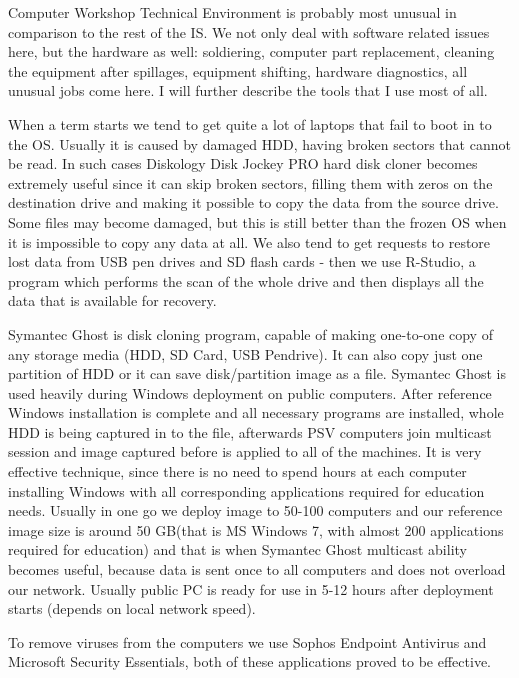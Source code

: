 \documentclass[10pt,a4paper,headinclude=true]{report}
\begin{document}
Computer Workshop Technical Environment is probably most unusual in comparison to the rest of the IS. We not only deal with software related issues here, but the hardware as well: soldiering, computer part replacement, cleaning the equipment after spillages, equipment shifting, hardware diagnostics, all unusual jobs come here. I will further describe the tools that I use most of all. 

When a term starts we tend to get quite a lot of laptops that fail to boot in to the OS. Usually it is caused by damaged HDD, having broken sectors that cannot be read. In such cases Diskology Disk Jockey PRO hard disk cloner\cite{DiskCloner} becomes extremely useful since it can skip broken sectors, filling them with zeros on the destination drive and making it possible to copy the data from the source drive. Some files may become damaged, but this is still better than the frozen OS when it is impossible to copy any data at all. We also tend to get requests to restore lost data from USB pen drives and SD flash cards - then we use R-Studio, a program which performs the scan of the whole drive and then displays all the data that is available for recovery. 

Symantec Ghost is disk cloning program, capable of making one-to-one copy of any storage media (HDD, SD Card, USB Pendrive). It can also copy just one partition of HDD or it can save disk/partition image as a file. Symantec Ghost is used heavily during Windows deployment on public computers. After reference Windows installation is complete and all necessary programs are installed, whole HDD is being captured in to the file, afterwards PSV computers join multicast session and image captured before is applied to all of the machines. It is very effective technique, since there is no need to spend hours at each computer installing Windows with all corresponding applications required for education needs. Usually in one go we deploy image to 50-100 computers and our reference image size is around 50 GB(that is MS Windows 7, with almost 200 applications required for education) and that is when Symantec Ghost multicast ability becomes useful, because data is sent once to all computers and does not overload our network. Usually public PC is ready for use in 5-12 hours after deployment starts (depends on local network speed).

To remove viruses from the computers we use Sophos Endpoint Antivirus and Microsoft Security Essentials, both of these applications proved to be effective.
 
\end{document}
